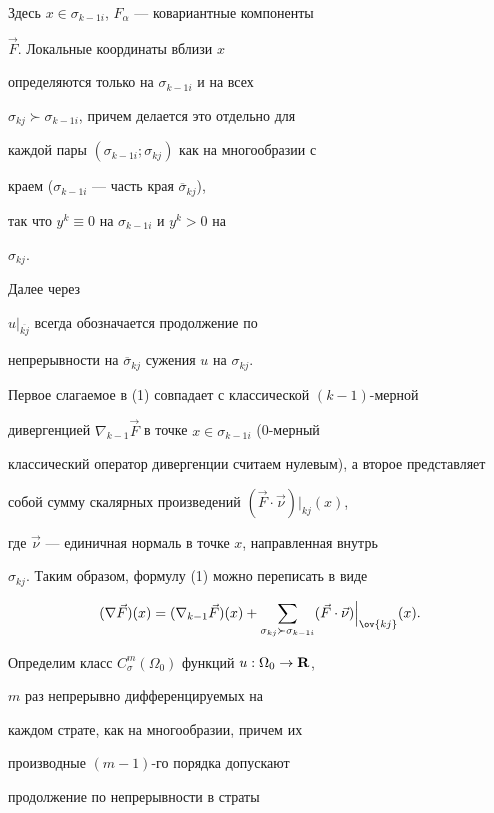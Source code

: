 Здесь $x\in\sigma_{k-1i}$, $F_\alpha$ --- ковариантные компоненты 


$\Vec F$. Локальные координаты вблизи $x$ 


определяются только на $\sigma_{k-1i}$ и на всех 


$\sigma_{kj}\succ\sigma_{k-1i}$, причем делается это отдельно для 


каждой пары $(\sigma_{k-1i};\sigma_{kj})$ как на многообразии с 


краем ($\sigma_{k-1i}$ --- часть края $\overline\sigma_{kj}$), 


так что $y^k\equiv 0$ на $\sigma_{k-1i}$ и $y^k>0$ на 


$\sigma_{kj}$. 


 


Далее через 


$u\big|_{\overline{kj}}$ всегда обозначается продолжение по 


непрерывности на $\overline\sigma_{kj}$ сужения $u$ на $\sigma_{kj}$. 


Первое слагаемое в (1) совпадает с классической $(k-1)$-мерной 


дивергенцией $\nabla_{k-1}\Vec F$ в точке $x\in\sigma_{k-1i}$ (0-мерный 


классический оператор дивергенции считаем нулевым), а второе представляет 


собой сумму скалярных произведений $(\Vec F\cdot\Vec\nu)\big|_{kj}(x)$, 


где $\Vec\nu$ --- единичная нормаль в точке $x$, направленная внутрь 


$\sigma_{kj}$. Таким образом, формулу (1) можно переписать в виде 


$$ 


(\nabla\Vec F)(x)=(\nabla_{k-1}\Vec F)(x)+ 


\sum_{\sigma_{kj}\succ\sigma_{k-1i}}(\Vec F\cdot\Vec\nu) 


\Big|_{\ov{kj}}(x). 


$$ 


Определим класс $C^m_\sigma(\Omega_0)$ функций $u: 


\Omega_0\rightarrow{\bold R}$, 


$m$ раз непрерывно дифференцируемых на 


каждом страте, как на многообразии, причем их 


производные $(m-1)$-го порядка допускают 


продолжение по непрерывности в страты 


